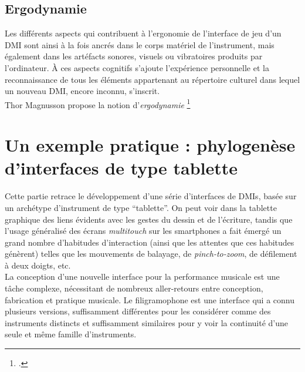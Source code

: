 \subsection{Ergodynamie}

\noindent Les différents aspects qui contribuent à l'ergonomie de l'interface de jeu d'un \gls{DMI} sont ainsi à la fois ancrés dans le corps matériel de l'instrument, mais également dans les artéfacts sonores, visuels ou vibratoires produits par l'ordinateur. À ces aspects cognitifs s'ajoute l'expérience personnelle et la reconnaissance de tous les éléments appartenant au répertoire culturel dans lequel un nouveau \gls{DMI}, encore inconnu, s'inscrit.\\
\indent Thor Magnusson propose la notion d'\textit{ergodynamie} \footnote{ \cite{magnusson_ergodynamics_2019}.}


\section{Un exemple pratique : phylogenèse d'interfaces de type tablette}
\label{sec:interfaces:phylogenese}

\noindent Cette partie retrace le développement d'une série d'interfaces de \glspl{DMI}, basée sur un archétype d'instrument de type ``tablette''. On peut voir dans la tablette graphique des liens évidents avec les gestes du dessin et de l'écriture, tandis que l'usage généralisé des écrans \textit{multitouch} sur les smartphones a fait émergé un grand nombre d'habitudes d'interaction (ainsi que les attentes que ces habitudes génèrent) telles que les mouvements de balayage, de \textit{pinch-to-zoom}, de défilement à deux doigts, etc.\\
\indent La conception d’une nouvelle interface pour la performance musicale est une tâche complexe, nécessitant de nombreux aller-retours entre conception, fabrication et pratique musicale. Le filigramophone est une interface qui a connu plusieurs versions, suffisamment différentes pour les considérer comme des instruments distincts et suffisamment similaires pour y voir la continuité d’une seule et même famille d'instruments.

